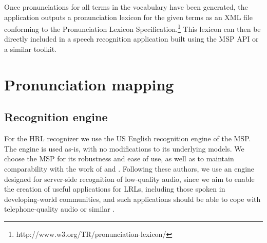 \documentclass[11pt]{article}
\begin{document}
Once pronunciations for all terms in the vocabulary have been generated, the application outputs a pronunciation lexicon for the given terms as an XML file conforming to the Pronunciation Lexicon Specification.\footnote{http://www.w3.org/TR/pronunciation-lexicon/} 
This lexicon can then be directly included in a speech recognition application built using the MSP API or a similar toolkit.






\section{Pronunciation mapping}
\label{sec:backend}

\subsection{Recognition engine}
\label{sec:engine}
For the HRL recognizer
we use the US English recognition engine 
of the MSP.
The engine is used as-is, with no modifications to its underlying models. 
We choose the MSP for its robustness and ease of use, as well as to maintain comparability with the work of  and . 
Following these authors, we use an engine designed for server-side recognition of low-quality audio, since we aim to enable the creation of useful applications for LRLs, including those spoken in developing-world communities, and such applications should be able to cope with telephone-quality audio or similar \cite{case4st4d}.
\end{document}
